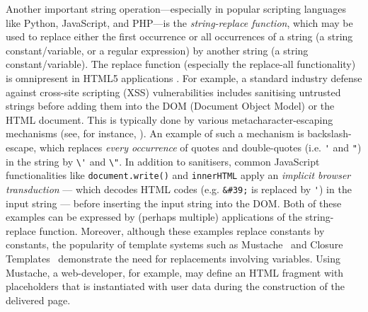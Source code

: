 Another important string operation---especially in popular scripting
languages like Python, JavaScript, and PHP---is the \emph{string-replace function}, 
which may be used to replace either the first occurrence or
all occurrences of a string (a string constant/variable, or a regular expression) by 
another string (a string constant/variable). The replace function (especially 
the replace-all functionality) is omnipresent in HTML5 applications
\cite{LB16,TCJ16,YABI14}. 
For example, a standard industry defense against cross-site scripting 
(XSS) vulnerabilities includes sanitising untrusted strings before adding them
into the DOM (Document Object Model) or the HTML document. 
This is typically done by %
various metacharacter-escaping mechanisms (see, for instance, 
\cite{Kern14,BEK,OWASP-XSS}). An example of such a mechanism is backslash-escape, which replaces \emph{every
occurrence} of quotes and double-quotes (i.e. \verb+'+ and \verb+"+) in the
string by \verb+\'+ and \verb+\"+. 
In addition to sanitisers, common JavaScript functionalities like \texttt{document.write()} 
and \texttt{innerHTML} apply an \emph{implicit browser transduction} --- which
decodes HTML codes (e.g. \verb+&#39;+ is replaced by \verb+'+) in the input 
string --- before inserting the input string into the DOM.
Both of these examples can be expressed by (perhaps multiple) 
applications of the string-replace function.
Moreover, although these examples replace constants by constants, the popularity of template systems such as Mustache~\cite{Mustache} and Closure Templates~\cite{Closure} demonstrate the need for replacements involving variables.
Using Mustache, a web-developer, for example, may define an HTML fragment with placeholders that is instantiated with user data during the construction of the delivered page.





